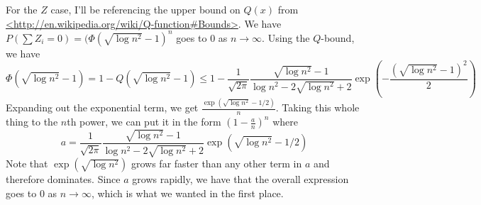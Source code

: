 \documentclass{article}
\begin{document}
For the $Z$ case, I'll be referencing the upper bound on $Q(x)$ from \url{<http://en.wikipedia.org/wiki/Q-function#Bounds>}. We have $P(\sum Z_i=0)=(\Phi(\sqrt{\log n^2}-1)^n$ goes to $0$ as $n\to\infty$. Using the $Q$-bound, we have 
$$\Phi(\sqrt{\log n^2}-1)=1-Q(\sqrt{\log n^2}-1)\leq1-\frac{1}{\sqrt{2\pi}}\frac{\sqrt{\log n^2}-1}{\log n^2-2\sqrt{\log n^2}+2}\exp\left(-\frac{(\sqrt{\log n^2}-1)^2}{2}\right)$$
Expanding out the exponential term, we get $\frac{\exp(\sqrt{\log n^2}-1/2)}{n}$. Taking this whole thing to the $n$th power, we can put it in the form $\left(1-\frac{a}{n}\right)^n$ where 
$$a=\frac{1}{\sqrt{2\pi}}\frac{\sqrt{\log n^2}-1}{\log n^2-2\sqrt{\log n^2}+2}\exp(\sqrt{\log n^2}-1/2)$$
Note that $\exp(\sqrt{\log n^2})$ grows far faster than any other term in $a$ and therefore dominates. Since $a$ grows rapidly, we have that the overall expression goes to $0$ as $n\to\infty$, which is what we wanted in the first place.
\end{document}
